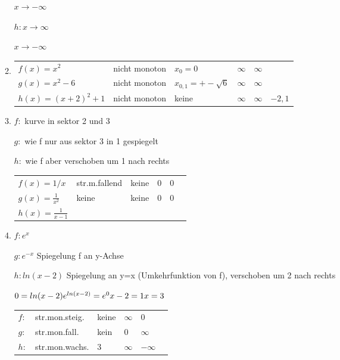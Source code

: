 \documentclass[12pt,a4paper]{scrreprt}
\begin{document}
\begin{enumerate}
\begin{enumerate}
$x \rightarrow -\infty$


$h:	
x \rightarrow \infty$

$x \rightarrow -\infty$


\item

\begin{tabular}{llllll}

$f(x)=x^2$				& nicht monoton	& $x_0=0$				& $\infty$				&	$\infty$				& \\
$g(x)=x^2-6$			& nicht monoton	& $x_{0,1}=+-\sqrt{6}$	& $\infty$				&	$\infty$			& \\
$h(x)=(x+2)^2+1$		& nicht monoton	& keine					& $\infty$				&	$\infty$				&	$-2,1$
\end{tabular}

\item

$f:$	kurve in sektor 2 und 3

$g:$	wie f nur aus sektor 3 in 1 gespiegelt

$h:$	wie f aber verschoben um 1 nach rechts

\begin{tabular}{llllll}
$f(x) = 1/x$			&str.m.fallend	&keine				&$0$					&$0$	\\
$g(x) = \frac{1}{x^2}$	&keine			&keine				&$0$					&$0$	\\
$h(x) = \frac{1}{x-1}$	&
\end{tabular}

\item

$f:	e^x			$

$g:	e^{-x}		$ Spiegelung f an y-Achse

$h:	ln(x-2)		$ Spiegelung an y=x (Umkehrfunktion von f), verschoben um 2 nach rechts

$0 = ln(x-2) \\
 e^{ln(x-2)} = e^0 \\
 x-2 = 1 \\
 x = 3$

\begin{tabular}{llllll}
$f:$					&str.mon.steig.	&keine			&$\infty$				&$0$				\\
$g:$					&str.mon.fall.	&kein			&$0$					&$\infty$			\\
$h:$					&str.mon.wachs.	&$3$			&$\infty$				&$-\infty$
\end{tabular}


\end{enumerate}
\end{enumerate}
\end{document}
